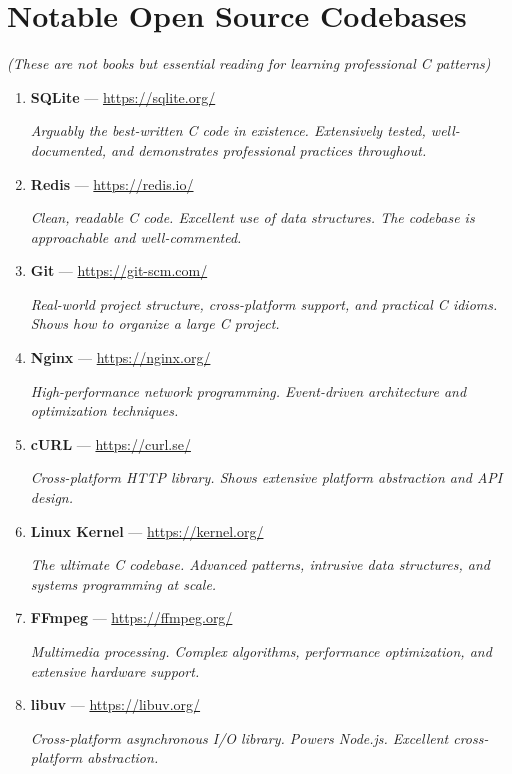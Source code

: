 \documentclass[10pt,openany]{book}
\begin{document}
\section*{Notable Open Source Codebases}

\textit{(These are not books but essential reading for learning professional C patterns)}

\begin{enumerate}
    \item \textbf{SQLite} — \url{https://sqlite.org/}

    \textit{Arguably the best-written C code in existence. Extensively tested, well-documented, and demonstrates professional practices throughout.}

    \item \textbf{Redis} — \url{https://redis.io/}

    \textit{Clean, readable C code. Excellent use of data structures. The codebase is approachable and well-commented.}

    \item \textbf{Git} — \url{https://git-scm.com/}

    \textit{Real-world project structure, cross-platform support, and practical C idioms. Shows how to organize a large C project.}

    \item \textbf{Nginx} — \url{https://nginx.org/}

    \textit{High-performance network programming. Event-driven architecture and optimization techniques.}

    \item \textbf{cURL} — \url{https://curl.se/}

    \textit{Cross-platform HTTP library. Shows extensive platform abstraction and API design.}

    \item \textbf{Linux Kernel} — \url{https://kernel.org/}

    \textit{The ultimate C codebase. Advanced patterns, intrusive data structures, and systems programming at scale.}

    \item \textbf{FFmpeg} — \url{https://ffmpeg.org/}

    \textit{Multimedia processing. Complex algorithms, performance optimization, and extensive hardware support.}

    \item \textbf{libuv} — \url{https://libuv.org/}

    \textit{Cross-platform asynchronous I/O library. Powers Node.js. Excellent cross-platform abstraction.}
\end{enumerate}
\end{document}
